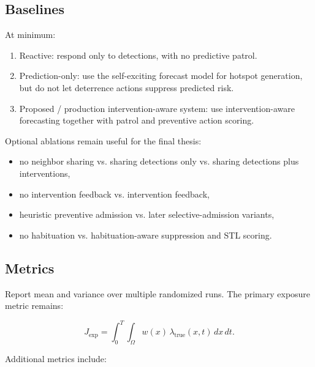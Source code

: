 \subsection{Baselines}

At minimum:

\begin{enumerate}
\item Reactive: respond only to detections, with no predictive patrol.
\item Prediction-only: use the self-exciting forecast model for hotspot generation, but do not let deterrence actions suppress predicted risk.
\item Proposed / production intervention-aware system: use intervention-aware forecasting together with patrol and preventive action scoring.
\end{enumerate}

Optional ablations remain useful for the final thesis:

\begin{itemize}
\item no neighbor sharing vs. sharing detections only vs. sharing detections plus interventions,
\item no intervention feedback vs. intervention feedback,
\item heuristic preventive admission vs. later selective-admission variants,
\item no habituation vs. habituation-aware suppression and STL scoring.
\end{itemize}

\subsection{Metrics}

Report mean and variance over multiple randomized runs. The primary exposure metric remains:

\begin{equation}
J_{\mathrm{exp}}
=
\int_0^T \int_{\Omega}
w(x)\,\lambda_{\mathrm{true}}(x,t)\,dx\,dt.
\end{equation}

Additional metrics include:

